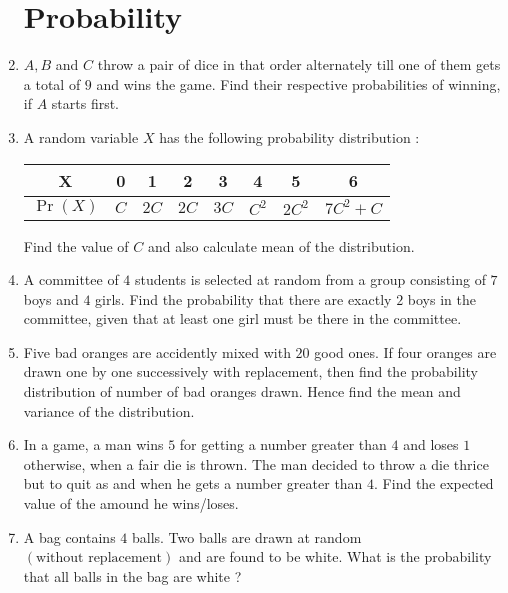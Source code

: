 \documentclass[12pt,-letter paper]{article}
\theoremstyle{remark}
\providecommand{\pr}[1]{\ensuremath{\Pr\left(#1\right)}}
\providecommand{\brak}[1]{\ensuremath{\left(#1\right)}}
\providecommand{\pr}[1]{\ensuremath{\Pr\left(#1\right)}}
\begin{document}
\begin{enumerate}
            \section{Probability}
      \item $A, B$ and $C$ throw a pair of dice in that order alternately till one of them gets a total of $9$ and wins the game. Find their respective probabilities of winning, if $A$ starts first.
      \item A random variable $X$ has the following probability distribution :
            \begin{table}[h!]
                  \begin{center}
                        \begin{tabular}{|c |c| c | c | c | c | c | c |}
                              \hline
                              X        & 0   & 1    & 2    & 3    & 4     & 5      & 6         \\
                              \hline
                              $\pr{X}$ & $C$ & $2C$ & $2C$ & $3C$ & $C^2$ & $2C^2$ & $7C^2 +C$ \\
                              \hline
                        \end{tabular}
                  \end{center}
            \end{table}
            Find the value of $C$ and also calculate mean of the distribution.
      \item A committee of $4$ students is selected at random from a group consisting of $7$ boys and $4$ girls. Find the probability that there are exactly $2$ boys in the committee, given that at least one girl must be there in the committee.
      \item Five bad oranges are accidently mixed with $20$ good ones. If four oranges are drawn one by one successively with replacement, then find the probability distribution of number of bad oranges drawn. Hence find the mean and variance of the distribution.
      \item In a game, a man wins \rupee $5$ for getting a number greater than $4$ and loses \rupee $1$ otherwise, when a fair die is thrown. The man decided to throw a die thrice but to quit as and when he gets a number greater than $4$. Find the expected value of the amound he wins/loses.
      \item A bag contains $4$ balls. Two balls are drawn at random \brak{\text{without replacement}} and are found to be white. What is the probability that all balls in the bag are white ?

\end{enumerate}
\end{document}
